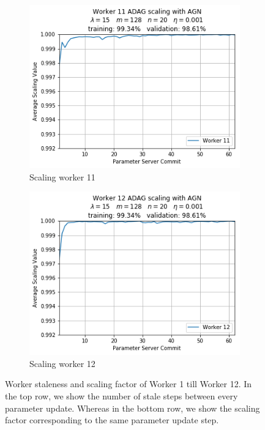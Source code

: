 \begin{figure}
\begin{subfigure}{.24\textwidth}
    \includegraphics[width=\linewidth]{resources/images/plots/adag_agn_mnist/epoch_40/15/001/scaling/worker_11}
    \caption{Scaling worker 11}
  \end{subfigure}
  \begin{subfigure}{.24\textwidth}
    \centering
    \includegraphics[width=\linewidth]{resources/images/plots/adag_agn_mnist/epoch_40/15/001/scaling/worker_12}
    \caption{Scaling worker 12}
  \end{subfigure}
  \caption{Worker staleness and scaling factor of Worker 1 till Worker 12. In the top row, we show the number of stale steps between every parameter update. Whereas in the bottom row, we show the scaling factor corresponding to the same parameter update step.}
  \label{fig:adag_worker_staleness_and_scaling}
\end{figure}

